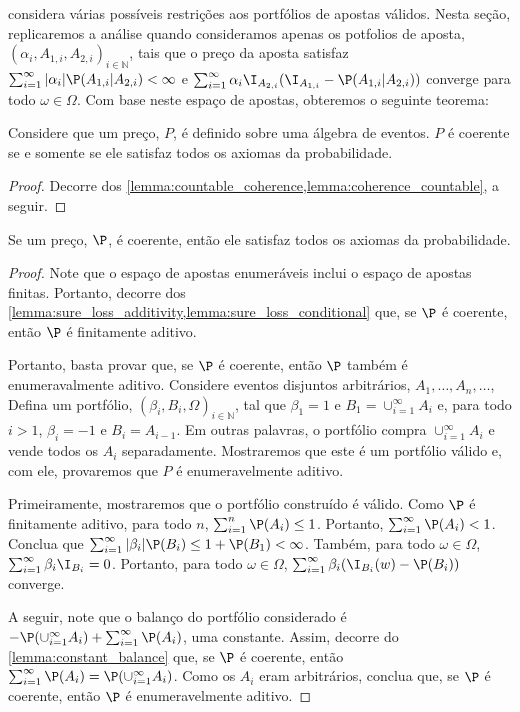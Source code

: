 \citet{Stern2015} considera várias possíveis
restrições aos portfólios de apostas válidos.
Nesta seção, replicaremos a análise quando
consideramos apenas os potfolios de aposta,
$(\alpha_{i},A_{1,i},A_{2,i})_{i \in \mathbb{N}}$,
tais que o preço da aposta satisfaz
$\sum_{i=1}^{\infty}{|\alpha_{i}|\P(A_{1,i}|A_{2,i})} < \infty$ e
$\sum_{i=1}^{\infty}{\alpha_{i}\I_{A_{2,i}}(\I_{A_{1,i}}-\P(A_{1,i}|A_{2,i}))}$ converge para 
todo $\omega \in \Omega$.
Com base neste espaço de apostas, 
obteremos o seguinte teorema:

\begin{theorem}
 \label{th:countable_coherence}
 Considere que um preço, $P$, é 
 definido sobre uma álgebra de eventos.
 $P$ é coerente se e somente se
 ele satisfaz todos os axiomas da probabilidade. 
\end{theorem}

\begin{proof}
 Decorre dos \cref{lemma:countable_coherence,lemma:coherence_countable}, a seguir.
\end{proof}

\begin{lemma}
 \label{lemma:countable_coherence}
 Se um preço, $\P$, é coerente, então 
 ele satisfaz todos os axiomas da probabilidade.
\end{lemma}

\begin{proof}
 Note que o espaço de apostas enumeráveis inclui 
 o espaço de apostas finitas.
 Portanto, decorre dos \cref{lemma:sure_loss_additivity,lemma:sure_loss_conditional} que,
 se $\P$ é coerente, então $\P$ é finitamente aditivo.

 Portanto, basta provar que, se $\P$ é coerente,
 então $\P$ também é enumeravalmente aditivo. 
 Considere eventos disjuntos arbitrários,
 $A_{1},\ldots,A_{n},\ldots$,
 Defina um portfólio, 
 $(\beta_{i},B_{i},\Omega)_{i \in \mathbb{N}}$, tal que
 $\beta_{1} = 1$ e 
 $B_{1} = \cup_{i=1}^{\infty}{A_{i}}$ e,
 para todo $i > 1$, 
 $\beta_{i} = -1$ e $B_{i} = A_{i-1}$.
 Em outras palavras, o portfólio compra
 $\cup_{i=1}^{\infty}{A_{i}}$ e
 vende todos os $A_{i}$ separadamente.
 Mostraremos que este é um portfólio válido e, com ele,
 provaremos que $P$ é enumeravelmente aditivo.

 Primeiramente, mostraremos que 
 o portfólio construído é válido.
 Como $\P$ é finitamente aditivo, para todo $n$,
 $\sum_{i=1}^{n}{\P(A_{i})} \leq 1$.
 Portanto, $\sum_{i=1}^{\infty}{\P(A_{i})} < 1$.
 Conclua que $\sum_{i=1}^{\infty}{|\beta_{i}|\P(B_{i})} \leq 1+\P(B_{1}) < \infty$.
 Também, para todo $\omega \in \Omega$,
 $\sum_{i=1}^{\infty}{\beta_{i}\I_{B_{i}}} = 0$.
 Portanto, para todo $\omega \in \Omega$,
 $\sum_{i=1}^{\infty}{\beta_{i}(\I_{B_{i}}(w)-\P(B_{i}))}$
 converge.
 
 A seguir, note que o balanço do portfólio considerado é
 $-\P(\cup_{i=1}^{\infty}{A_{i}})+\sum_{i=1}^{\infty}{\P(A_{i})}$, uma constante.
 Assim, decorre do \cref{lemma:constant_balance} que,
 se $\P$ é coerente, então
 $\sum_{i=1}^{\infty}{\P(A_{i})}=\P(\cup_{i=1}^{\infty}{A_{i}})$.
 Como os $A_{i}$ eram arbitrários, conclua que, 
 se $\P$ é coerente,
 então $\P$ é enumeravelmente aditivo.
\end{proof}

